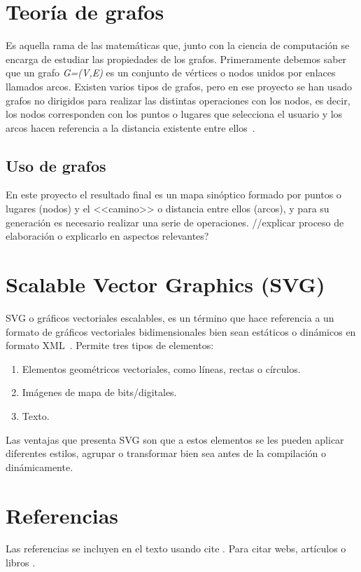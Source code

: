 \section{Teoría de grafos}
Es aquella rama de las matemáticas que, junto con la ciencia de computación se encarga de estudiar las propiedades de los grafos. Primeramente debemos saber que un grafo \textit{G=(V,E)} es un conjunto de vértices o nodos unidos por enlaces llamados arcos.
Existen varios tipos de grafos, pero en ese proyecto se han usado grafos no dirigidos para realizar las distintas operaciones con los nodos, es decir, los nodos corresponden con los puntos o lugares que selecciona el usuario y los arcos hacen referencia a la distancia existente entre ellos~\cite{wiki:tgrafos}. 

\subsection{Uso de grafos}
En este proyecto el resultado final es un mapa sinóptico formado por puntos o lugares (nodos) y el <<camino>> o distancia entre ellos (arcos), y para su generación es necesario realizar una serie de operaciones. 
//explicar proceso de elaboración o explicarlo en aspectos relevantes?


\section{Scalable Vector Graphics (SVG)}
SVG o gráficos vectoriales escalables, es un término que hace referencia a un formato de gráficos vectoriales bidimensionales bien sean estáticos o dinámicos en formato XML~\cite{wiki:xml}.
Permite tres tipos de elementos:
\begin{enumerate}
	\item Elementos geométricos vectoriales, como líneas, rectas o círculos.
	\item Imágenes de mapa de bits/digitales.
	\item Texto.
\end{enumerate}

Las ventajas que presenta SVG son que a estos elementos se les pueden aplicar diferentes estilos, agrupar o transformar bien sea antes de la compilación o dinámicamente. 

\section{Referencias}

Las referencias se incluyen en el texto usando cite \cite{wiki:latex}. Para citar webs, artículos o libros \cite{koza92}.



